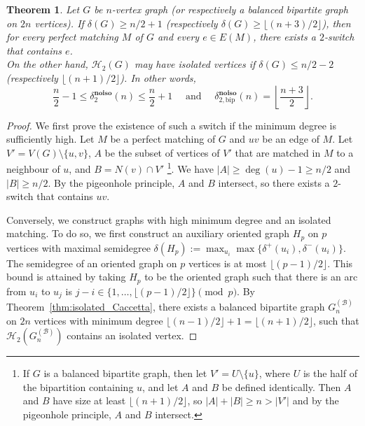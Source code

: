 \documentclass[11pt,a4paper]{article}
\newtheorem{theorem}{Theorem}[section]
\theoremstyle{definition}
\begin{document}
\begin{theorem}\label{thm:isolated_k=2}
  Let $G$ be $n$-vertex graph (or respectively a balanced bipartite graph on
  $2n$ vertices). If $\delta(G) \ge n/2+1$ (respectively
  $\delta(G) \ge \lfloor (n+3)/2\rfloor$), then for every perfect matching $M$
  of $G$ and every $e \in E(M)$, there exists a $2$-switch that contains $e$.\\
  On the other hand, $\mathcal H_2(G)$ may have isolated vertices if
  $\delta(G) \le n/2 -2$ (respectively $ \lfloor (n+1)/2\rfloor$). In other words,
  $$ \frac{n}2-1 \le \delta^{\mathbf{no iso}}_2(n) \le \frac{n}2+1  \quad \text{ and } \quad
  \delta^{\mathbf{no iso}}_{2,\mathrm{bip}}(n) = \left\lfloor \frac{n+3}2 \right\rfloor.$$
\end{theorem}
\begin{proof}
  We first prove the existence of such a switch if the minimum degree is sufficiently high. Let $M$ be a perfect matching of $G$ and $uv$ be an edge of $M$. Let $V' = V(G) \setminus \{u,v\}$, $A$ be the subset of vertices of
  $V'$ that are matched in $M$ to a neighbour of $u$, and $B = N(v) \cap V'$
  \footnote{If $G$ is a balanced bipartite graph, then let
    $V' = U \setminus \{u\}$, where $U$ is the half of the bipartition
    containing $u$, and let $A$ and $B$ be defined identically. Then $A$ and $B$ have
    size at least $\lfloor (n+1)/2\rfloor$, so $|A| + |B| \ge n > |V'|$ and by the
    pigeonhole principle, $A$ and $B$ intersect.}. We have
  $|A| \ge \deg(u) -1 \ge n/2$ and $|B| \ge n/2$. By the pigeonhole principle, $A$
  and $B$ intersect, so there exists a $2$-switch that contains $uv$.

  Conversely, we construct graphs with high minimum degree and an isolated
  matching. To do so, we first construct an auxiliary oriented graph $H_p$ on
  $p$ vertices with maximal semidegree
  $\delta(H_p) := \max_{u_i} \max \{\delta^+(u_i), \delta^-(u_i)\}$. The
  semidegree of an oriented graph on $p$ vertices is at most
  $\lfloor (p-1)/2 \rfloor$. This bound is attained by taking $H_p$ to be the
  oriented graph such that there is an arc from $u_i$ to $u_j$ is
  $j-i \in \{1, \dots, \lfloor (p-1)/2 \rfloor\} \pmod p$. By
  Theorem~\ref{thm:isolated_Caccetta}, there exists a balanced bipartite graph
  $G_n^{(\mathcal B)}$ on $2n$ vertices with minimum degree
  $\lfloor (n-1)/2 \rfloor +1 = \lfloor (n+1)/2\rfloor$, such that
  $\mathcal H_2(G_n^{(\mathcal B)})$ contains an isolated vertex.


\end{proof}
\end{document}
